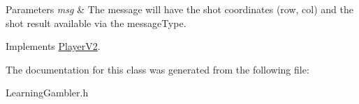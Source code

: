\begin{DoxyParams}{Parameters}
{\em msg} & The message will have the shot coordinates (row, col) and the shot result available via the message\+Type. \\
\hline
\end{DoxyParams}


Implements \hyperlink{classPlayerV2_a8d87312a1ce2756e25bb6e6438e8673c}{Player\+V2}.



The documentation for this class was generated from the following file\+:\begin{DoxyCompactItemize}
\item 
Learning\+Gambler.\+h\end{DoxyCompactItemize}

